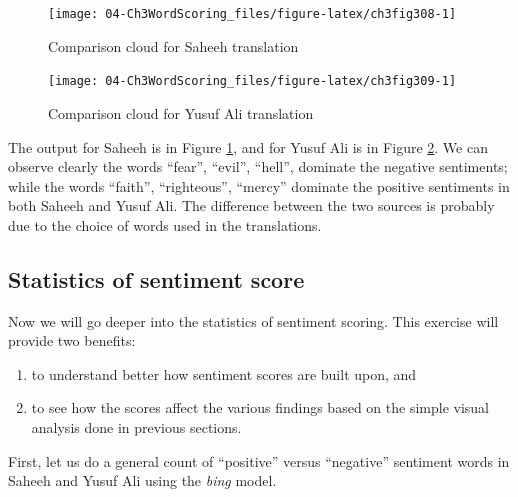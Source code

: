 \documentclass[
]{article}
\providecommand{\tightlist}{%
  \setlength{\itemsep}{0pt}\setlength{\parskip}{0pt}}
\begin{document}
\begin{figure}

{\centering \texttt{[image: 04-Ch3WordScoring\_files/figure-latex/ch3fig308-1]} 

}

\caption{Comparison cloud for Saheeh translation}\label{fig:ch3fig308}
\end{figure}

\begin{figure}

{\centering \texttt{[image: 04-Ch3WordScoring\_files/figure-latex/ch3fig309-1]} 

}

\caption{Comparison cloud for Yusuf Ali translation}\label{fig:ch3fig309}
\end{figure}

The output for Saheeh is in Figure \ref{fig:ch3fig308}, and for Yusuf Ali is in Figure \ref{fig:ch3fig309}. We can observe clearly the words ``fear'', ``evil'', ``hell'', dominate the negative sentiments; while the words ``faith'', ``righteous'', ``mercy'' dominate the positive sentiments in both Saheeh and Yusuf Ali. The difference between the two sources is probably due to the choice of words used in the translations.

\hypertarget{statistics-of-sentiment-score}{%
\subsection{Statistics of sentiment score}\label{statistics-of-sentiment-score}}

Now we will go deeper into the statistics of sentiment scoring. This exercise will provide two benefits:

\begin{enumerate}
\def\labelenumi{\alph{enumi})}
\tightlist
\item
  to understand better how sentiment scores are built upon, and
\item
  to see how the scores affect the various findings based on the simple visual analysis done in previous sections.
\end{enumerate}

First, let us do a general count of ``positive'' versus ``negative'' sentiment words in Saheeh and Yusuf Ali using the \emph{bing} model.

\footnotesize
\end{document}
